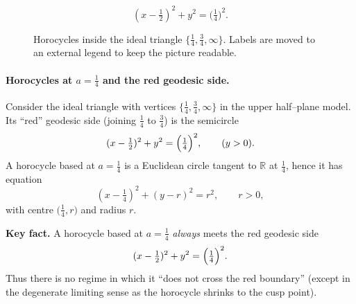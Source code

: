 \documentclass[12pt,a4paper]{article}
\newcommand{\R}{\mathbb{R}}
\theoremstyle{plain}
\theoremstyle{definition}      %
\begin{document}
\begin{figure}[ht]
	
	\[
	(x-\tfrac12)^2+y^2=\bigl(\tfrac14\bigr)^2.
	\]
	
	\caption{Horocycles inside the ideal triangle $\{\tfrac14,\tfrac34,\infty\}$. Labels are moved to an external legend to keep the picture readable.}
\end{figure}

\paragraph{Horocycles at $a=\tfrac14$ and the red geodesic side.}
Consider the ideal triangle with vertices $\{\tfrac14,\tfrac34,\infty\}$ in the upper half--plane model.
Its ``red'' geodesic side (joining $\tfrac14$ to $\tfrac34$) is the semicircle
\[
(x-\tfrac12)^2+y^2=\Bigl(\tfrac14\Bigr)^2,\qquad (y>0).
\]
A horocycle based at $a=\tfrac14$ is a Euclidean circle tangent to $\R$ at $\tfrac14$, hence it has equation
\[
(x-\tfrac14)^2+(y-r)^2=r^2,\qquad r>0,
\]
with centre $\bigl(\tfrac14,r\bigr)$ and radius $r$.

\medskip

\noindent
\textbf{Key fact.}
A horocycle based at $a=\tfrac14$ \emph{always} meets the red geodesic side
\[
(x-\tfrac12)^2+y^2=\Bigl(\tfrac14\Bigr)^2.
\]
Thus there is no regime in which it ``does not cross the red boundary'' (except in the degenerate limiting sense as
the horocycle shrinks to the cusp point).
\end{document}
